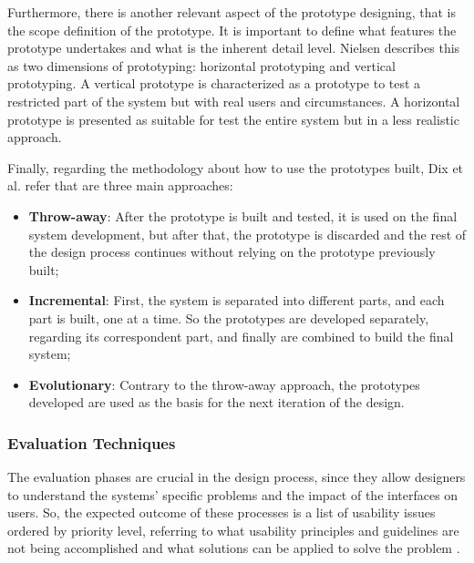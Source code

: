 Furthermore, there is another relevant aspect of the prototype designing, that is the scope definition of the prototype. It is important to define what features the prototype undertakes and what is the inherent detail level. Nielsen \cite{usabilityEngineering} describes this as two dimensions of prototyping: horizontal prototyping and vertical prototyping. %
A vertical prototype is characterized as a prototype to test a restricted part of the system but with real users and circumstances. A horizontal prototype is presented as suitable for test the entire system but in a less realistic approach.


Finally, regarding the methodology about how to use the prototypes built, Dix et al. \cite{humanComputerInteraction} refer that are three main approaches:

\begin{itemize}
	\item \textbf{Throw-away}: After the prototype is built and tested, it is used on the final system development, but after that, the prototype is discarded and the rest of the design process continues without relying on the prototype previously built;
	\item \textbf{Incremental}: First, the system is separated into different parts, and each part is built, one at a time. So the prototypes are developed separately, regarding its correspondent part, and finally are combined to build the final system;
	\item \textbf{Evolutionary}: Contrary to the throw-away approach, the prototypes developed are used as the basis for the next iteration of the design.
\end{itemize}





\subsubsection{Evaluation Techniques}
\label{subsubsec:user_and_task_analysis}
The evaluation phases are crucial in the design process, since they allow designers to understand the systems' specific problems and the impact of the interfaces on users. So, the expected outcome of these processes is a list of usability issues ordered by priority level, referring to what usability principles and guidelines are not being accomplished and what solutions can be applied to solve the problem \cite{usabilityEngineering}.  

